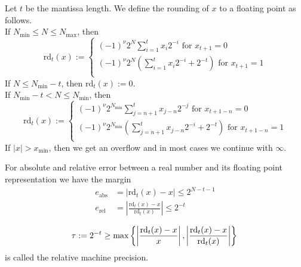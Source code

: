 %
\begin{definition} \label{theo:round}
    Let \(t\) be the mantissa length. We define the rounding of \(x\) to a floating point as follows. \\
    If \(N_{\text{min}} \leq N \leq N_{\text{max}}\), then
    \begin{equation*}
        \text{rd}_t(x) :=
        \begin{cases}
            (-1)^{\nu} 2^N \sum_{i = 1}^{t}x_i 2^{-i} \text{ for } x_{t+1} = 0 \\
            (-1)^{\nu} 2^N (\sum_{i = 1}^{t}x_i 2^{-i} + 2^{-t}) \text{ for } x_{t+1} = 1 \\
        \end{cases}
    \end{equation*}
    If \(N \leq N_{\text{min}} - t\), then \(\text{rd}_t(x) := 0\). \\
    If \(N_{\text{min}} - t < N \leq N_{\text{min}}\), then
    \begin{equation*}
        \text{rd}_t(x) :=
        \begin{cases}
            (-1)^{\nu} 2^{N_{\text{min}}} \sum_{j = n + 1}^{t}x_{j-n} 2^{-j} \text{ for } x_{t+1-n} = 0 \\
            (-1)^{\nu} 2^{N_{\text{min}}} (\sum_{j = n + 1}^{t}x_{j-n} 2^{-i} + 2^{-t}) \text{ for } x_{t+1-n} = 1 \\
        \end{cases}
    \end{equation*}
    If \(|x| > x_{\text{min}}\), then we get an overflow and in most cases we continue with \(\infty\).  \cite{bib:rabus}
\end{definition}
%
\begin{lemma} \label{theo:margin}
    For absolute and relative error between a real number and its floating point representation we have the margin  \cite{bib:rabus}
    \begin{align*}
        e_{\text{abs}} &= | \text{rd}_t(x) - x | \leq 2^{N - t - 1} \\
        e_{\text{rel}} &= \left| \frac{\text{rd}_t(x) - x}{\text{rd}_t(x)} \right| \leq 2^{-t}
    \end{align*}
\end{lemma}
%
\begin{definition}
    \begin{equation*}
        \tau := 2^{-t} \geq \text{max} \left\{ \left| \frac{\text{rd}_t(x) - x}{x}\right|, \left| \frac{\text{rd}_t(x) - x}{\text{rd}_t(x)} \right| \right\} \\
    \end{equation*}
    is called the relative machine precision.  \cite{bib:rabus}
\end{definition}

